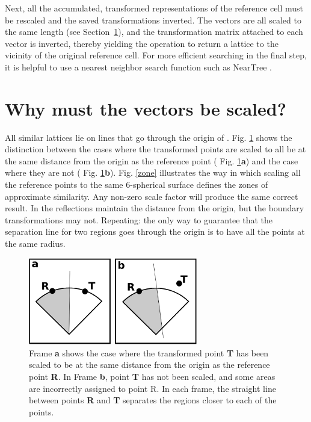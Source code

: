 \documentclass[preprint]{iucr}              %
\numberwithin{equation}{section}
\numberwithin{equation}{section}
\begin{document}
	
	Next, all the accumulated, transformed representations of the reference cell must be rescaled and the saved
	transformations inverted.
	The \SVI{} vectors are all scaled to the same length (see Section~\ref{section:modified}), and the transformation matrix
	attached to each vector is inverted, thereby yielding the operation to return a lattice to the vicinity of the
	original reference cell. For more efficient searching in the final step, it is helpful to use
	a nearest neighbor search function such as NearTree \cite{andrews2016}.
	
	\section{Why must the \SVI{} vectors be scaled?} 	\label{section:modified}
	
	All similar lattices lie on lines that go through the origin of \SVI{}. Fig. \ref{similarity} shows
	the distinction between the cases where the transformed points are scaled to all be at the same
	distance from the origin as the reference point ( Fig. \ref{similarity}\textbf{a}) and the case where they are not ( Fig. \ref{similarity}\textbf{b}).
	Fig. \ref{zone} illustrates the way in which scaling all the reference points to the same
	6-spherical surface defines the zones of approximate similarity.
	Any non-zero scale factor will produce the same correct result. In \SVI{}
	the reflections maintain the distance from the origin, but the boundary transformations may not.
	Repeating: the only way to guarantee that the
	separation line for two regions goes through the origin is to have all the points at
	the same radius.
	
	\begin{figure}
		\label{similarity}
		\includegraphics[height=3.8cm]{similarity}
		\caption{Frame \textbf{a} shows the case where the transformed point \textbf{T} has been scaled to be at the same distance 
			from the origin as the reference point \textbf{R}.  In Frame \textbf{b}, point \textbf{T} has not been scaled, and some areas
			are incorrectly assigned to point R.  In each frame, the straight line between points \textbf{R} and \textbf{T} separates the 
			regions closer to each of the points.}
	\end{figure}
	
\end{document}
